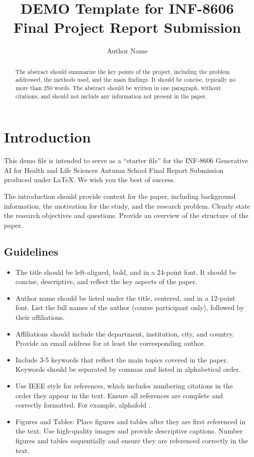 \documentclass{ReportStyle}
\title{DEMO Template for INF-8606 Final Project Report Submission}
\author{Author Name}
\affil[1]{Affiliation}
\affil[*]{E-mail any correspondence to: xyz@uit.no}
\begin{document}
\maketitle

\begin{abstract}
The abstract should summarize the key points of the project, including the problem addressed, the methods used, and the main findings.
It should be concise, typically no more than 250 words. The abstract should be written in one paragraph, without citations, and should not include any information not present in the paper.


\end{abstract}

\section{Introduction}
This demo file is intended to serve as a ``starter file'' for the INF-8606 Generative AI for Health and Life Sciences Autumn School Final Report Submission produced under \LaTeX . We wish you the best of success. 

The introduction should provide context for the paper, including background information, the motivation for the study, and the research problem. Clearly state the research objectives and questions. Provide an overview of the structure of the paper.


\subsection{Guidelines}
\begin{itemize}

\item The title should be left-aligned, bold, and in a 24-point font. It should be concise, descriptive, and reflect the key aspects of the paper.
\item Author name should be listed under the title, centered, and in a 12-point font. List the full names of the author (course participant only), followed by their affiliations.
  \item Affiliations should include the department, institution, city, and country. Provide an email address for at least the corresponding author.
  \item Include 3-5 keywords that reflect the main topics covered in the paper. Keywords should be separated by commas and listed in alphabetical order.
  \item Use IEEE style for references, which includes numbering citations in the order they appear in the text. Ensure all references are complete and correctly formatted. For example, alphafold \cite{ruff2021alphafold}.
  \item Figures and Tables: Place figures and tables after they are first referenced in the text. Use high-quality images and provide descriptive captions. Number figures and tables sequentially and ensure they are referenced correctly in the text.
\end{itemize}
\end{document}
